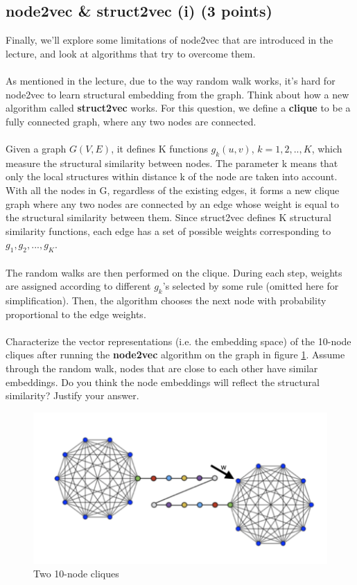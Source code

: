 \documentclass{article}
\numberwithin{figure}{section}
\begin{document}
	\subsection{node2vec \& struct2vec (i) (3 points)}
	Finally, we’ll explore some limitations of node2vec that are introduced in the lecture, and look at algorithms that try to overcome them.\\
	\\
	As mentioned in the lecture, due to the way random walk works, it’s hard for node2vec to learn structural embedding from the graph. Think about how a new algorithm called \textbf{struct2vec} works. For this question, we define a \textbf{clique} to be a fully connected graph, where any two nodes are connected.\\
	\\
	Given a graph $G(V,E)$, it defines K functions $g_k(u,v)$, $k = 1,2,..,K$, which measure the structural similarity between nodes. The parameter k means that only the local structures within distance k of the node are taken into account.
	With all the nodes in G, regardless of the existing edges, it forms a new clique graph where any two nodes are connected by an edge whose weight is equal to the structural similarity between them. Since struct2vec defines K structural similarity functions, each edge has a set of possible weights corresponding to $g_1, g_2,...,g_K$.\\
	\\
	The random walks are then performed on the clique. During each step, weights are assigned according to different $g_k$’s selected by some rule (omitted here for simplification). Then, the algorithm chooses the next node with probability proportional to the edge weights.\\
	\\
	Characterize the vector representations (i.e. the embedding space) of the 10-node cliques after running the \textbf{node2vec} algorithm on the graph in figure \ref{fig:10-node}. Assume through the random walk, nodes that are close to each other have similar embeddings. Do you think the node embeddings will reflect the structural similarity? Justify your answer.
	
	\begin{figure}[!htb]
		\centering
		\includegraphics[width=0.6\columnwidth]{fig5.png}
		\caption{Two 10-node cliques}
		\label{fig:10-node}
	\end{figure}
	
\end{document}
